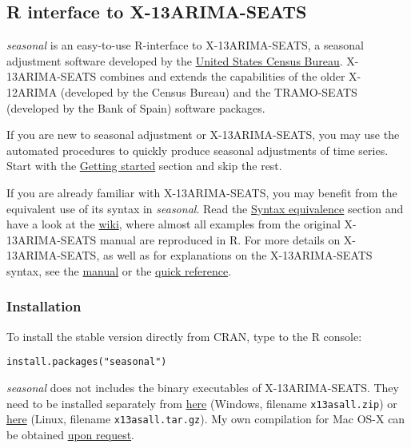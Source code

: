 \subsection{R interface to
X-13ARIMA-SEATS}\label{r-interface-to-x-13arima-seats}

\emph{seasonal} is an easy-to-use R-interface to X-13ARIMA-SEATS, a
seasonal adjustment software developed by the
\href{http://www.census.gov/srd/www/x13as/}{United States Census
Bureau}. X-13ARIMA-SEATS combines and extends the capabilities of the
older X-12ARIMA (developed by the Census Bureau) and the TRAMO-SEATS
(developed by the Bank of Spain) software packages.

If you are new to seasonal adjustment or X-13ARIMA-SEATS, you may use
the automated procedures to quickly produce seasonal adjustments of time
series. Start with the \hyperref[getting-started]{Getting started}
section and skip the rest.

If you are already familiar with X-13ARIMA-SEATS, you may benefit from
the equivalent use of its syntax in \emph{seasonal}. Read the
\hyperref[syntax-equivalence-to-x-13arima-seats]{Syntax equivalence}
section and have a look at the
\href{https://github.com/christophsax/seasonal/wiki/Examples-of-X-13ARIMA-SEATS-in-R}{wiki},
where almost all examples from the original X-13ARIMA-SEATS manual are
reproduced in R. For more details on X-13ARIMA-SEATS, as well as for
explanations on the X-13ARIMA-SEATS syntax, see the
\href{http://www.census.gov/ts/x13as/docX13AS.pdf}{manual} or the
\href{http://www.census.gov/ts/x13as/pc/qrefX13ASpc.pdf}{quick
reference}.

\subsubsection{Installation}\label{installation}

To install the stable version directly from CRAN, type to the R console:

\begin{verbatim}
install.packages("seasonal")
\end{verbatim}

\emph{seasonal} does not includes the binary executables of
X-13ARIMA-SEATS. They need to be installed separately from
\href{http://www.census.gov/srd/www/x13as/x13down_pc.html}{here}
(Windows, filename \texttt{x13asall.zip}) or
\href{http://www.census.gov/srd/www/x13as/x13down_unix.html}{here}
(Linux, filename \texttt{x13asall.tar.gz}). My own compilation for Mac
OS-X can be obtained \href{mailto:christoph.sax@gmail.com}{upon
request}.

